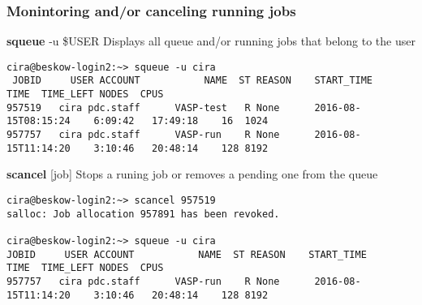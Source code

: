 \begin{frame}[fragile]
\frametitle{Monintoring and/or canceling running jobs }
\begin{alertblock}{\textbf{squeue} -u  \$USER}
  Displays all queue and/or running jobs that belong to the user
\tiny
  \begin{verbatim}
cira@beskow-login2:~> squeue -u cira
 JOBID     USER ACCOUNT           NAME  ST REASON    START_TIME                TIME  TIME_LEFT NODES  CPUS
957519   cira pdc.staff      VASP-test   R None      2016-08-15T08:15:24    6:09:42   17:49:18    16  1024
957757   cira pdc.staff      VASP-run    R None      2016-08-15T11:14:20    3:10:46   20:48:14    128 8192
  \end{verbatim}
\end{alertblock}

\begin{alertblock}{\textbf{scancel} [job]}
Stops a runing job or removes a pending one from the queue
\tiny
  \begin{verbatim}
cira@beskow-login2:~> scancel 957519
salloc: Job allocation 957891 has been revoked.

cira@beskow-login2:~> squeue -u cira
JOBID     USER ACCOUNT           NAME  ST REASON    START_TIME                TIME  TIME_LEFT NODES  CPUS
957757   cira pdc.staff      VASP-run    R None      2016-08-15T11:14:20    3:10:46   20:48:14    128 8192
  \end{verbatim}
\end{alertblock}
\end{frame}

